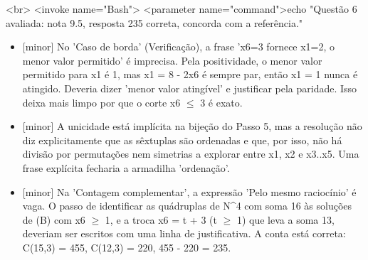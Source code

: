 \documentclass{article}%
\begin{document}
\newline%
<br>\newline%
\newline%
\newline%
<invoke name="Bash">\newline%
<parameter name="command">echo "Questão 6 avaliada: nota 9.5, resposta 235 correta, concorda com a referência." %
\begin{itemize}%
\item%
{[}minor{]} No 'Caso de borda' (Verificação), a frase 'x6=3 fornece x1=2, o menor valor permitido' é imprecisa. Pela positividade, o menor valor permitido para x1 é 1, mas x1 = 8 - 2x6 é sempre par, então x1 = 1 nunca é atingido. Deveria dizer 'menor valor atingível' e justificar pela paridade. Isso deixa mais limpo por que o corte x6 $\leq$ 3 é exato.%
\item%
{[}minor{]} A unicidade está implícita na bijeção do Passo 5, mas a resolução não diz explicitamente que as sêxtuplas são ordenadas e que, por isso, não há divisão por permutações nem simetrias a explorar entre x1, x2 e x3..x5. Uma frase explícita fecharia a armadilha 'ordenação'.%
\item%
{[}minor{]} Na 'Contagem complementar', a expressão 'Pelo mesmo raciocínio' é vaga. O passo de identificar as quádruplas de N\^{}4 com soma 16 às soluções de (B) com x6 $\geq$ 1, e a troca x6 = t + 3 (t $\geq$ 1) que leva a soma 13, deveriam ser escritos com uma linha de justificativa. A conta está correta: C(15,3) = 455, C(12,3) = 220, 455 - 220 = 235.%
\end{itemize}%
\end{document}

